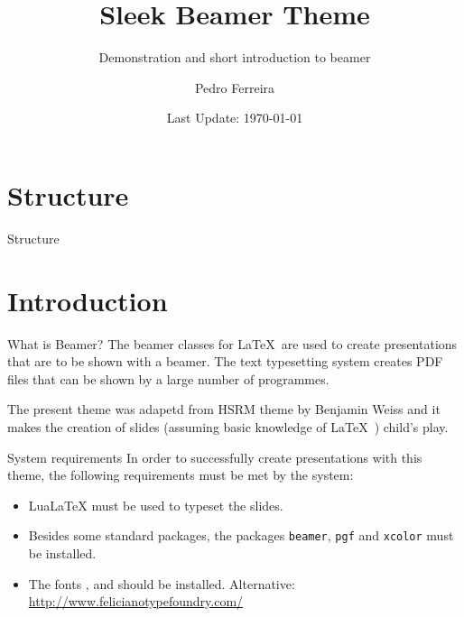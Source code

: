 \documentclass[compress,aspectratio=169]{beamer}
\title{Sleek Beamer Theme}
\subtitle{Demonstration and short introduction to beamer}
\date{Last Update: \today}
\author{Pedro Ferreira}
\institute{DEMEC\\ {\Medium FEUP}}
\begin{document}

\maketitle


\section*{Structure}
\begin{frame}{Structure}
	\tableofcontents[hideallsubsections]
\end{frame}

\section{Introduction}

\begin{frame}{What is Beamer?}
	The beamer classes for \LaTeX\ are used to create presentations that are to be shown with a beamer. The text typesetting system creates PDF files that can be shown by a large number of programmes.
	
	The present theme was adapetd from HSRM theme by Benjamin Weiss and it makes the creation of slides (assuming basic knowledge of \LaTeX\ ) child's play.
\end{frame}

\begin{frame}{System requirements}
	In order to successfully create presentations with this theme, the following requirements must be met by the system:
	\begin{itemize}
		\item LuaLaTeX must be used to typeset the slides.
		\item Besides some standard packages, the packages \texttt{beamer}, \texttt{pgf} and \texttt{xcolor} must be installed.
		\item The fonts ,  and  should be installed. Alternative: \\\url{http://www.felicianotypefoundry.com/}
	\end{itemize}
\end{frame}
\end{document}
